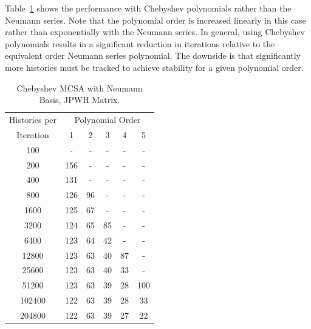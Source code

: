 \documentclass[10pt]{article}
\begin{document}
Table~\ref{tab:jpwh_cheby_neumann} shows the performance
with Chebyshev polynomials rather than the Neumann
series.  Note that the polynomial order is increased
linearly in this case rather than exponentially with the
Neumann series.  In general, using Chebyshev polynomials
results in a significant reduction in iterations relative to
the equivalent order Neumann series polynomial.  The
downside is that significantly more histories must be
tracked to achieve stability for a given polynomial order.
\begin{table}
\caption{Chebyshev MCSA with Neumann Basis, JPWH Matrix.
\label{tab:jpwh_cheby_neumann}}
\centering
\begin{tabular}{cccccc}
 \toprule
 Histories per & \multicolumn{5}{c}{Polynomial Order} \\
 Iteration & 1 & 2 & 3 & 4 & 5 \\
 \midrule
 100 & - & - & - & - & - \\
 200 & 156 & - & - & - & - \\
 400 & 131 & - & - & - & - \\
 800 & 126 & 96 & - & - & - \\
 1600 & 125 & 67 & - & - & - \\
 3200 & 124 & 65 & 85 & - & - \\
 6400 & 123 & 64 & 42 & - & - \\
 12800 & 123 & 63 & 40 & 87 & - \\
 25600 & 123 & 63 & 40 & 33 & - \\
 51200 & 123 & 63 & 39 & 28 & 100 \\
 102400 & 122 & 63 & 39 & 28 & 33 \\
 204800 & 122 & 63 & 39 & 27 & 22 \\
\bottomrule
\end{tabular}
\end{table}
\end{document}
